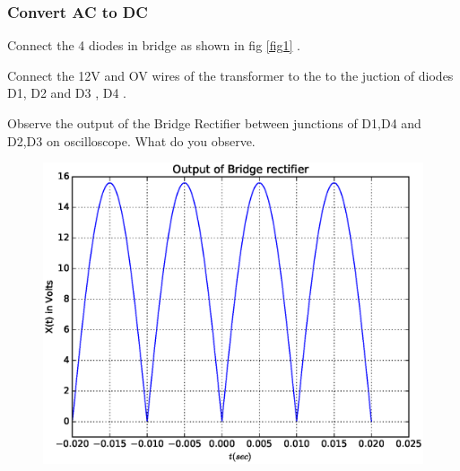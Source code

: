 \documentclass[journal,12pt,twocolumn]{IEEEtran}
\begin{document}
\subsubsection{Convert AC to DC}
\begin{problem}
Connect the 4 diodes in bridge as shown in fig \ref{fig1} .
\end{problem}
\begin{problem}
Connect the 12V and OV wires of the transformer to the to the juction of diodes D1, D2 and D3 , D4 .   
\end{problem}
\begin{problem}
Observe the output of the Bridge Rectifier between junctions of D1,D4 and D2,D3 on  oscilloscope. What do you observe.
\end{problem}
\solution
\begin{figure}[h]
\centering
	\includegraphics[scale=0.4]{./figs/sine.eps}
	\caption{}  \label{fig2}
    \end{figure}

\end{document}
